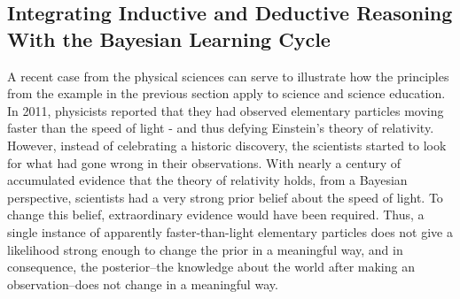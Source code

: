 \documentclass[man]{apa7}
\begin{document}
\subsection{Integrating Inductive and Deductive Reasoning With the Bayesian Learning Cycle}

A recent case from the physical sciences can serve to illustrate how the principles from the example in the previous section apply to science and science education. In 2011, physicists reported that they had observed elementary particles moving faster than the speed of light \parencite{b11} - and thus defying Einstein’s theory of relativity. However, instead of celebrating a historic discovery, the scientists started to look for what had gone wrong in their observations. With nearly a century of accumulated evidence that the theory of relativity holds, from a Bayesian perspective, scientists had a very strong prior belief about the speed of light. To change this belief, extraordinary evidence would have been required. Thus, a single instance of apparently faster-than-light elementary particles does not give a likelihood strong enough to change the prior in a meaningful way, and in consequence, the posterior--the knowledge about the world after making an observation--does not change in a meaningful way. \\
\end{document}

